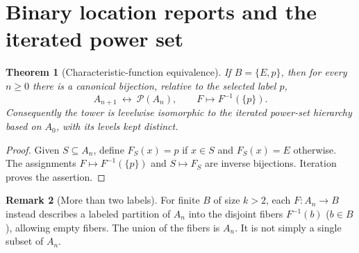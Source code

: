 \documentclass[11pt]{article}
\newtheorem{theorem}{Theorem}[section]
\theoremstyle{definition}
\newtheorem{remark}[theorem]{Remark}
\newcommand{\Pow}{\mathcal P}
\begin{document}
\section{Binary location reports and the iterated power set}
\begin{theorem}[Characteristic-function equivalence]\label{thm:powerset}
If $B=\{E,p\}$, then for every $n\ge0$ there is a canonical bijection, relative to the selected label $p$,
\[
A_{n+1}\ \longleftrightarrow\ \Pow(A_n),\qquad F\longmapsto F^{-1}(\{p\}).
\]
Consequently the tower is levelwise isomorphic to the iterated power-set hierarchy based on $A_0$, with its levels kept distinct.
\end{theorem}
\begin{proof}Given $S\subseteq A_n$, define $F_S(x)=p$ if $x\in S$ and $F_S(x)=E$ otherwise. The assignments $F\mapsto F^{-1}(\{p\})$ and $S\mapsto F_S$ are inverse bijections. Iteration proves the assertion.\end{proof}
\begin{remark}[More than two labels]
For finite $B$ of size $k>2$, each $F:A_n\to B$ instead describes a labeled partition of $A_n$ into the disjoint fibers $F^{-1}(b)$ ($b\in B$), allowing empty fibers. The union of the fibers is $A_n$. It is not simply a single subset of $A_n$.
\end{remark}
\end{document}
